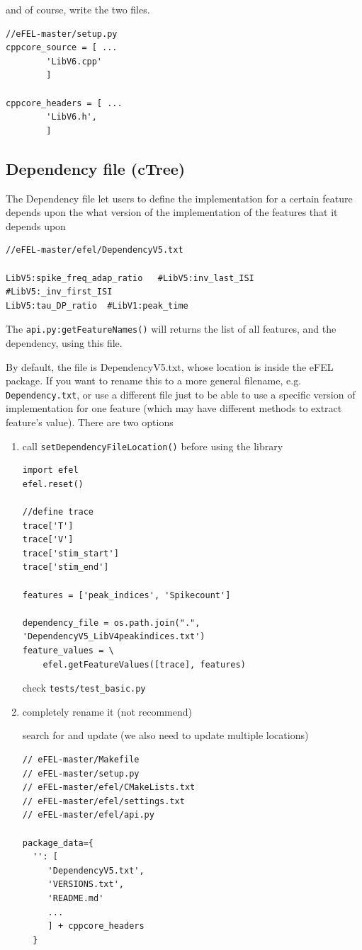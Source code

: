 and of course, write the two files.

\begin{verbatim}
//eFEL-master/setup.py 
cppcore_source = [ ...
        'LibV6.cpp'
        ]

cppcore_headers = [ ...
        'LibV6.h',
        ]
\end{verbatim}

\subsection{Dependency file (cTree)}
\label{sec:dependency-file}
\label{sec:cTree-class}

The Dependency file let users to define the implementation for a certain
feature depends upon the what version of the implementation of the features that
it depends upon

\begin{verbatim}
//eFEL-master/efel/DependencyV5.txt

LibV5:spike_freq_adap_ratio   #LibV5:inv_last_ISI #LibV5:_inv_first_ISI
LibV5:tau_DP_ratio  #LibV1:peak_time
\end{verbatim}
The \verb!api.py:getFeatureNames()! will returns the list of all features, and
the dependency, using this file.

By default, the file is DependencyV5.txt, whose location is inside the eFEL
package. If you want to rename this to a more general filename, e.g.
\verb!Dependency.txt!, or use a different file just to be able to use a
specific version of implementation for one feature (which may have different
methods to extract feature's value). There are two options

\begin{enumerate}
  \item call \verb!setDependencyFileLocation()! before using the library

\begin{lstlisting}
import efel
efel.reset()

//define trace
trace['T']
trace['V']
trace['stim_start']
trace['stim_end']

features = ['peak_indices', 'Spikecount']

dependency_file = os.path.join(".", 'DependencyV5_LibV4peakindices.txt')
feature_values = \
    efel.getFeatureValues([trace], features)
\end{lstlisting}  
check \verb!tests/test_basic.py! 

  \item completely rename it (not recommend)

search for and update (we also need to update multiple
locations)
\begin{verbatim}
// eFEL-master/Makefile   
// eFEL-master/setup.py   
// eFEL-master/efel/CMakeLists.txt
// eFEL-master/efel/settings.txt
// eFEL-master/efel/api.py

package_data={
  '': [
     'DependencyV5.txt',
     'VERSIONS.txt',
     'README.md'
     ...
     ] + cppcore_headers
  }
\end{verbatim}
\end{enumerate}


